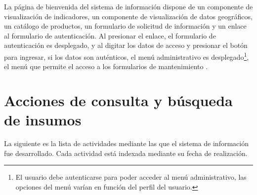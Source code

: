 \documentclass[9pt,a4paper]{IEEEtran}
\begin{document}
La p\'agina de bienvenida del sistema de informaci\'on dispone de un componente de visualizaci\'on de indicadores, un componente de visualizaci\'on de datos geogr\'aficos, un cat\'alogo de productos, un formulario de solicitud de informaci\'on y un enlace al formulario de autenticaci\'on. Al presionar el enlace, el formulario de autenticaci\'on es desplegado, y al digitar los datos de acceso y presionar el bot\'on para ingresar, si los datos son aut\'enticos, el men\'u administrativo es desplegado\footnote{El usuario debe autenticarse para poder acceder al men\'u administrativo, las opciones del men\'u var\'ian en funci\'on del perfil del usuario.}, el men\'u que permite el acceso a los formularios de mantenimiento \cite{userm}.

\section{Acciones de consulta y b\'usqueda de insumos} \label{sec:binnacle}

La siguiente es la lista de actividades mediante las que el sistema de informaci\'on fue desarrollado. Cada actividad est\'a indexada mediante su fecha de realizaci\'on.
\end{document}
